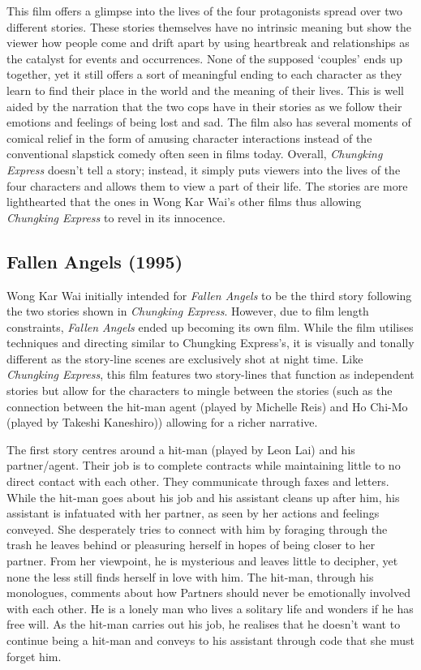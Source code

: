 \begin{multicols}{2}
This film offers a glimpse into the lives of the four protagonists spread over two different stories. These stories themselves have no intrinsic meaning but show the viewer how people come and drift apart by using heartbreak and relationships as the catalyst for events and occurrences. None of the supposed ‘couples’ ends up together, yet it still offers a sort of meaningful ending to each character as they learn to find their place in the world and the meaning of their lives. This is well aided by the narration that the two cops have in their stories as we follow their emotions and feelings of being lost and sad. The film also has several moments of comical relief in the form of amusing character interactions instead of the conventional slapstick comedy often seen in films today. Overall, \emph{Chungking Express} doesn't tell a story; instead, it simply puts viewers into the lives of the four characters and allows them to view a part of their life. The stories are more lighthearted that the ones in Wong Kar Wai's other films thus allowing \emph{Chungking Express} to revel in its innocence.

\subsection{Fallen Angels (1995)}
Wong Kar Wai initially intended for \emph{Fallen Angels} to be the third story following the two stories shown in \emph{Chungking Express}. However, due to film length constraints, \emph{Fallen Angels} ended up becoming its own film. While the film utilises techniques and directing similar to Chungking Express's, it is visually and tonally different as the story-line scenes are exclusively shot at night time. Like \emph{Chungking Express}, this film features two story-lines that function as independent stories but allow for the characters to mingle between the stories (such as the connection between the hit-man agent (played by Michelle Reis) and Ho Chi-Mo (played by Takeshi Kaneshiro)) allowing for a richer narrative.

The first story centres around a hit-man (played by Leon Lai) and his partner/agent. Their job is to complete contracts while maintaining little to no direct contact with each other. They communicate through faxes and letters. While the hit-man goes about his job and his assistant cleans up after him, his assistant is infatuated with her partner, as seen by her actions and feelings conveyed. She desperately tries to connect with him by foraging through the trash he leaves behind or pleasuring herself in hopes of being closer to her partner. From her viewpoint, he is mysterious and leaves little to decipher, yet none the less still finds herself in love with him. The hit-man, through his monologues, comments about how Partners should never be emotionally involved with each other. He is a lonely man who lives a solitary life and wonders if he has free will. As the hit-man carries out his job, he realises that he doesn't want to continue being a hit-man and conveys to his assistant through code that she must forget him.


\end{multicols}
